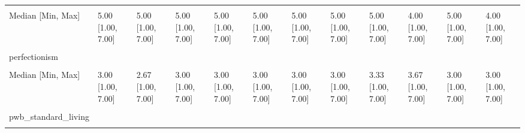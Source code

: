 \documentclass[
  single column]{article}
\begin{document}
\begin{landscape}
\begin{longtable}[t]{llllllllllll}
\cellcolor{gray!10}{Mean (SD)} & \cellcolor{gray!10}{4.40 (1.65)} & \cellcolor{gray!10}{5.02 (1.47)} & \cellcolor{gray!10}{4.69 (1.49)} & \cellcolor{gray!10}{4.67 (1.59)} & \cellcolor{gray!10}{4.60 (1.60)} & \cellcolor{gray!10}{4.74 (1.52)} & \cellcolor{gray!10}{4.80 (1.57)} & \cellcolor{gray!10}{4.19 (1.69)} & \cellcolor{gray!10}{4.17 (1.85)} & \cellcolor{gray!10}{5.03 (1.48)} & \cellcolor{gray!10}{4.36 (1.79)}\\
\addlinespace
Median [Min, Max] & 5.00 [1.00, 7.00] & 5.00 [1.00, 7.00] & 5.00 [1.00, 7.00] & 5.00 [1.00, 7.00] & 5.00 [1.00, 7.00] & 5.00 [1.00, 7.00] & 5.00 [1.00, 7.00] & 5.00 [1.00, 7.00] & 4.00 [1.00, 7.00] & 5.00 [1.00, 7.00] & 4.00 [1.00, 7.00]\\
\cellcolor{gray!10}{Missing} & \cellcolor{gray!10}{1146 (5.3\%)} & \cellcolor{gray!10}{56 (4.1\%)} & \cellcolor{gray!10}{12 (4.4\%)} & \cellcolor{gray!10}{100 (5.0\%)} & \cellcolor{gray!10}{188 (5.1\%)} & \cellcolor{gray!10}{65 (5.9\%)} & \cellcolor{gray!10}{9 (6.6\%)} & \cellcolor{gray!10}{9 (10.3\%)} & \cellcolor{gray!10}{16 (2.4\%)} & \cellcolor{gray!10}{14 (2.4\%)} & \cellcolor{gray!10}{44 (5.9\%)}\\
perfectionism &  &  &  &  &  &  &  &  &  &  & \\
\cellcolor{gray!10}{Mean (SD)} & \cellcolor{gray!10}{3.16 (1.46)} & \cellcolor{gray!10}{2.87 (1.35)} & \cellcolor{gray!10}{3.14 (1.46)} & \cellcolor{gray!10}{3.01 (1.40)} & \cellcolor{gray!10}{3.16 (1.41)} & \cellcolor{gray!10}{3.12 (1.39)} & \cellcolor{gray!10}{3.09 (1.51)} & \cellcolor{gray!10}{3.39 (1.53)} & \cellcolor{gray!10}{3.72 (1.39)} & \cellcolor{gray!10}{2.99 (1.32)} & \cellcolor{gray!10}{3.27 (1.56)}\\
Median [Min, Max] & 3.00 [1.00, 7.00] & 2.67 [1.00, 7.00] & 3.00 [1.00, 7.00] & 3.00 [1.00, 7.00] & 3.00 [1.00, 7.00] & 3.00 [1.00, 7.00] & 3.00 [1.00, 7.00] & 3.33 [1.00, 7.00] & 3.67 [1.00, 7.00] & 3.00 [1.00, 7.00] & 3.00 [1.00, 7.00]\\
\addlinespace
\cellcolor{gray!10}{Missing} & \cellcolor{gray!10}{118 (0.5\%)} & \cellcolor{gray!10}{14 (1.0\%)} & \cellcolor{gray!10}{1 (0.4\%)} & \cellcolor{gray!10}{24 (1.2\%)} & \cellcolor{gray!10}{38 (1.0\%)} & \cellcolor{gray!10}{9 (0.8\%)} & \cellcolor{gray!10}{2 (1.5\%)} & \cellcolor{gray!10}{4 (4.6\%)} & \cellcolor{gray!10}{4 (0.6\%)} & \cellcolor{gray!10}{4 (0.7\%)} & \cellcolor{gray!10}{4 (0.5\%)}\\
pwb\_standard\_living &  &  &  &  &  &  &  &  &  &  & \\
\cellcolor{gray!10}{Mean (SD)} & \cellcolor{gray!10}{7.35 (2.20)} & \cellcolor{gray!10}{7.76 (2.03)} & \cellcolor{gray!10}{7.29 (2.15)} & \cellcolor{gray!10}{7.50 (2.10)} & \cellcolor{gray!10}{7.52 (2.11)} & \cellcolor{gray!10}{7.21 (2.31)} & \cellcolor{gray!10}{7.24 (2.22)} & \cellcolor{gray!10}{7.30 (2.33)} & \cellcolor{gray!10}{6.65 (2.40)} & \cellcolor{gray!10}{7.69 (1.98)} & \cellcolor{gray!10}{6.67 (2.56)}\\

\end{longtable}
\end{landscape}
\end{document}
